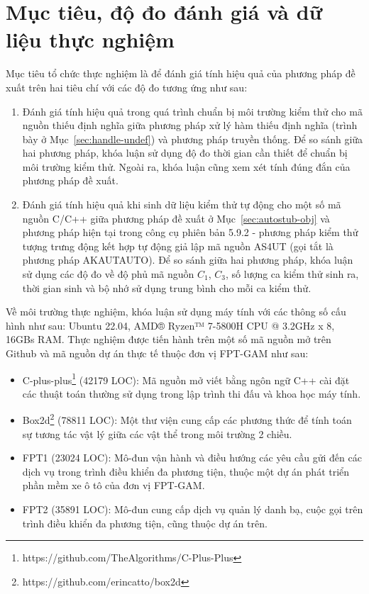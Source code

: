 \section{Mục tiêu, độ đo đánh giá và dữ liệu thực nghiệm}
Mục tiêu tổ chức thực nghiệm là để đánh giá tính hiệu quả của phương pháp đề xuất trên hai tiêu chí với các độ đo tương ứng như sau:
\begin{enumerate}
    \item Đánh giá tính hiệu quả trong quá trình chuẩn bị môi trường kiểm thử cho mã nguồn thiếu định nghĩa giữa phương pháp xử lý hàm thiếu định nghĩa (trình bày ở Mục~\ref{sec:handle-undef}) và phương pháp truyền thống. Để so sánh giữa hai phương pháp, khóa luận sử dụng độ đo thời gian cần thiết để chuẩn bị môi trường kiểm thử. Ngoài ra, khóa luận cũng xem xét tính đúng đắn của phương pháp đề xuất.
    \item Đánh giá tính hiệu quả khi sinh dữ liệu kiểm thử tự động cho một số mã nguồn C/C++ giữa phương pháp đề xuất ở Mục~\ref{sec:autostub-obj} và phương pháp hiện tại trong công cụ phiên bản 5.9.2 - phương pháp kiểm thử tượng trưng động kết hợp tự động giả lập mã nguồn AS4UT (gọi tắt là phương pháp AKAUTAUTO). Để so sánh giữa hai phương pháp, khóa luận sử dụng các độ đo về độ phủ mã nguồn $C_1$, $C_3$, số lượng ca kiểm thử sinh ra, thời gian sinh và bộ nhớ sử dụng trung bình cho mỗi ca kiểm thử.
\end{enumerate}

Về môi trường thực nghiệm, khóa luận sử dụng máy tính với các thông số cấu hình như sau: Ubuntu 22.04, AMD® Ryzen™ 7-5800H CPU @ 3.2GHz x 8, 16GBs RAM. Thực nghiệm được tiến hành trên một số mã nguồn mở trên Github và mã nguồn dự án thực tế thuộc đơn vị FPT-GAM như sau:
\begin{itemize}
    \item C-plus-plus\footnote{https://github.com/TheAlgorithms/C-Plus-Plus} (42179 LOC): Mã nguồn mở viết bằng ngôn ngữ C++ cài đặt các thuật toán thường sử dụng trong lập trình thi đấu và khoa học máy tính.
    \item Box2d\footnote{https://github.com/erincatto/box2d} (78811 LOC): Một thư viện cung cấp các phương thức để tính toán sự tương tác vật lý giữa các vật thể trong môi trường 2 chiều.
    \item FPT1 (23024 LOC): Mô-đun vận hành và điều hướng các yêu cầu gửi đến các dịch vụ trong trình điều khiển đa phương tiện, thuộc một dự án phát triển phần mềm xe ô tô của đơn vị FPT-GAM.
    \item FPT2 (35891 LOC): Mô-đun cung cấp dịch vụ quản lý danh bạ, cuộc gọi trên trình điều khiển đa phương tiện, cũng thuộc dự án trên.
\end{itemize}

